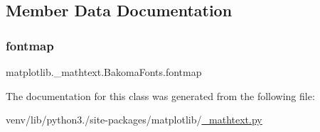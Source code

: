 \subsection{Member Data Documentation}
\mbox{\label{classmatplotlib_1_1__mathtext_1_1BakomaFonts_a6ff3c9fd4af0e1927d3c576eed588b27}} 
\subsubsection{\texorpdfstring{fontmap}{fontmap}}
{\footnotesize\ttfamily matplotlib.\+\_\+mathtext.\+Bakoma\+Fonts.\+fontmap}



The documentation for this class was generated from the following file\+:\begin{DoxyCompactItemize}
\item 
venv/lib/python3./site-\/packages/matplotlib/\hyperlink{__mathtext_8py}{\+\_\+mathtext.\+py}\end{DoxyCompactItemize}
